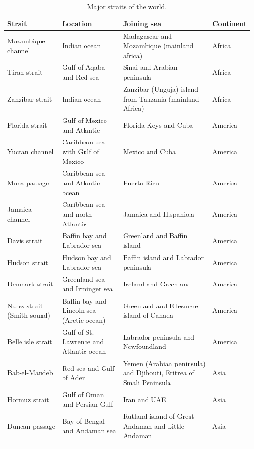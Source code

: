 \documentclass[
  openany]{book}
\begin{document}
\begin{longtable}[t]{>{\raggedright\arraybackslash}p{6em}>{\raggedright\arraybackslash}p{8em}>{\raggedright\arraybackslash}p{8em}>{\raggedright\arraybackslash}p{5em}}
\caption{\label{tab:world-straits}Major straits of the world.}\\
\toprule
Strait & Location & Joining sea & Continent\\
\midrule
\rowcolor{gray!6}  Mozambique channel & Indian ocean & Madagascar and Mozambique (mainland africa) & Africa\\
Tiran strait & Gulf of Aqaba and Red sea & Sinai and Arabian peninsula & Africa\\
\rowcolor{gray!6}  Zanzibar strait & Indian ocean & Zanzibar (Unguja) island from Tanzania (mainland Africa) & Africa\\
Florida strait & Gulf of Mexico and Atlantic & Florida Keys and Cuba & America\\
\rowcolor{gray!6}  Yuctan channel & Caribbean sea with Gulf of Mexico & Mexico and Cuba & America\\
\addlinespace
Mona passage & Caribbean sea and Atlantic ocean & Puerto Rico & America\\
\rowcolor{gray!6}  Jamaica channel & Caribbean sea and north Atlantic & Jamaica and Hispaniola & America\\
Davis strait & Baffin bay and Labrador sea & Greenland and Baffin island & America\\
\rowcolor{gray!6}  Hudson strait & Hudson bay and Labrador sea & Baffin island and Labrador peninsula & America\\
Denmark strait & Greenland sea and Irminger sea & Iceland and Greenland & America\\
\addlinespace
\rowcolor{gray!6}  Nares strait (Smith sound) & Baffin bay and Lincoln sea (Arctic ocean) & Greenland and Ellesmere island of Canada & America\\
Belle isle strait & Gulf of St. Lawrence and Atlantic ocean & Labrador peninsula and Newfoundland & America\\
\rowcolor{gray!6}  Bab-el-Mandeb & Red sea and Gulf of Aden & Yemen (Arabian peninsula) and Djibouti, Eritrea of Smali Peninsula & Asia\\
Hormuz strait & Gulf of Oman and Persian Gulf & Iran and UAE & Asia\\
\rowcolor{gray!6}  Duncan passage & Bay of Bengal and Andaman sea & Rutland island of Great Andaman and Little Andaman & Asia\\
\addlinespace

\end{longtable}
\end{document}
